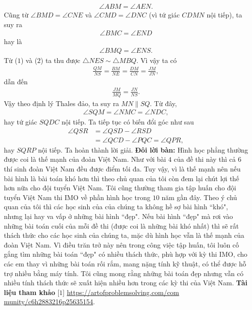 \begin{multicols}{2}
		\begin{align*}\angle ABM=\angle AEN.\tag{$1$}\end{align*}
		Cũng từ $\angle BMD=\angle CNE$ và $\angle CMD=\angle DNC$ (vì tứ giác $CDMN$ nội tiếp), ta suy ra
		\begin{align*}
			\angle BMC=\angle END
		\end{align*} hay là 
		\begin{align*}
			\angle BMQ=\angle ENS. \tag{$2$}
		\end{align*}
		Từ ($1$) và ($2$) ta thu được $\triangle NES\sim\triangle MBQ$. Vì vậy ta có 
		\begin{align*}
			\frac{QM}{NS}=\frac{BM}{NE}=\frac{DM}{CN}=\frac{JM}{JN},
		\end{align*}
		dẫn đến
		\begin{align*}
			\frac{JM}{MQ}=\frac{JN}{NS}.
		\end{align*}
		Vậy theo định lý Thales đảo, ta suy ra \linebreak$MN\parallel SQ$. Từ đây,
		\begin{align*}
			\angle SQM=\angle NMC=\angle NDC,
		\end{align*} hay tứ giác $SQDC$ nội tiếp. Ta tiếp tục có biến đổi góc như sau
		\begin{align*}
			\angle QSR&=\angle QSD-\angle RSD\\
			&=\angle QCD-\angle PQC=\angle QPR,
		\end{align*}
		hay $SQRP$ nội tiếp. Ta hoàn thành lời giải.
	\vskip 0.05cm
	{\bf\color{cackithi}Đôi lời bàn:}
	Hình học phẳng thường được coi là thế mạnh của đoàn Việt Nam. Như với bài $4$ của đề thi này thì cả $6$ thí sinh đoàn Việt Nam đều được điểm tối đa. Tuy vậy, vì là thế mạnh nên nếu bài hình là bài toán khó hơn thì theo chủ quan của tôi còn đem lại chút lợi thế hơn nữa cho đội tuyển Việt Nam. Tôi cũng thường tham gia tập huấn cho đội tuyển Việt Nam thi IMO về phần hình học trong $10$ năm gần đây. Theo ý chủ quan của tôi thì các học sinh của của chúng ta không hề sợ bài hình ``khó", nhưng lại hay va vấp ở những bài hình ``đẹp". Nếu bài hình ``đẹp" mà rơi vào những bài toán cuối của mỗi đề thi (được coi là những bài khó nhất) thì sẽ rất thách thức cho các học sinh của chúng ta, mặc dù hình học vẫn là thế mạnh của đoàn Việt Nam. Vì điều trăn trở này nên trong công việc tập huấn, tôi luôn cố gắng tìm những bài toán ``đẹp" có nhiều thách thức, phù hợp với kỳ thi IMO, cho các em thay vì những bài toán rối rắm, mang nặng tính kỹ thuật, có thể được hỗ trợ nhiều bằng máy tính. Tôi cũng mong rằng những bài toán đẹp nhưng vẫn có nhiều tính thách thức sẽ xuất hiện nhiều hơn trong các kỳ thi của Việt Nam.
	\vskip 0.05cm
	\textbf{\color{cackithi}Tài liệu tham khảo}
	\vskip 0.05cm
	[$1$] \url{https://artofproblemsolving.com/com} \url{munity/c6h2883216p25635154}.
\end{multicols}

